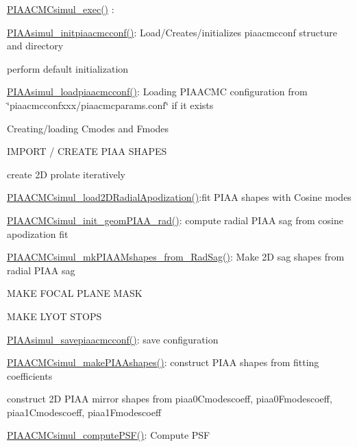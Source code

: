\begin{DoxyItemize}
\item \hyperlink{PIAACMCsimul_8c_a1083c078214e43d74447950f8a236c5d}{P\+I\+A\+A\+C\+M\+Csimul\+\_\+exec()} \+:
\begin{DoxyItemize}
\item \hyperlink{PIAACMCsimul_8c_a85f1459cf776292b7e2fff9932a79252}{P\+I\+A\+Asimul\+\_\+initpiaacmcconf()}\+: Load/\+Creates/initializes piaacmcconf structure and directory
\begin{DoxyItemize}
\item perform default initialization
\item \hyperlink{PIAACMCsimul_8c_adedec73128f41e8b3f83796bf913c8da}{P\+I\+A\+Asimul\+\_\+loadpiaacmcconf()}\+: Loading P\+I\+A\+A\+C\+M\+C configuration from \char`\"{}piaacmcconfxxx/piaacmcparams.\+conf\char`\"{} if it exists
\item Creating/loading Cmodes and Fmodes
\item I\+M\+P\+O\+R\+T / C\+R\+E\+A\+T\+E P\+I\+A\+A S\+H\+A\+P\+E\+S
\begin{DoxyItemize}
\item create 2\+D prolate iteratively
\item \hyperlink{PIAACMCsimul_8c_a6828d3577dee2b0882bd7df99602f30d}{P\+I\+A\+A\+C\+M\+Csimul\+\_\+load2\+D\+Radial\+Apodization()}\+:fit P\+I\+A\+A shapes with Cosine modes
\item \hyperlink{PIAACMCsimul_8c_a8e2b36e622c11627571989ab113d85eb}{P\+I\+A\+A\+C\+M\+Csimul\+\_\+init\+\_\+geom\+P\+I\+A\+A\+\_\+rad()}\+: compute radial P\+I\+A\+A sag from cosine apodization fit
\item \hyperlink{PIAACMCsimul_8c_adad6ba0da7cd47c07c35232b6096fa1c}{P\+I\+A\+A\+C\+M\+Csimul\+\_\+mk\+P\+I\+A\+A\+Mshapes\+\_\+from\+\_\+\+Rad\+Sag()}\+: Make 2\+D sag shapes from radial P\+I\+A\+A sag
\end{DoxyItemize}
\item M\+A\+K\+E F\+O\+C\+A\+L P\+L\+A\+N\+E M\+A\+S\+K
\item M\+A\+K\+E L\+Y\+O\+T S\+T\+O\+P\+S
\item \hyperlink{PIAACMCsimul_8c_aac928f8658448934caa7e805af8606a8}{P\+I\+A\+Asimul\+\_\+savepiaacmcconf()}\+: save configuration
\end{DoxyItemize}
\item \hyperlink{PIAACMCsimul_8c_a3a6aa31c31adb655f2afa2416e155684}{P\+I\+A\+A\+C\+M\+Csimul\+\_\+make\+P\+I\+A\+Ashapes()}\+: construct P\+I\+A\+A shapes from fitting coefficients
\begin{DoxyItemize}
\item construct 2\+D P\+I\+A\+A mirror shapes from piaa0\+Cmodescoeff, piaa0\+Fmodescoeff, piaa1\+Cmodescoeff, piaa1\+Fmodescoeff
\end{DoxyItemize}
\item \hyperlink{PIAACMCsimul_8c_a5c872da1e39bdc8e5ec4dfadc6a42690}{P\+I\+A\+A\+C\+M\+Csimul\+\_\+compute\+P\+S\+F()}\+: Compute P\+S\+F
\end{DoxyItemize}
\end{DoxyItemize}

